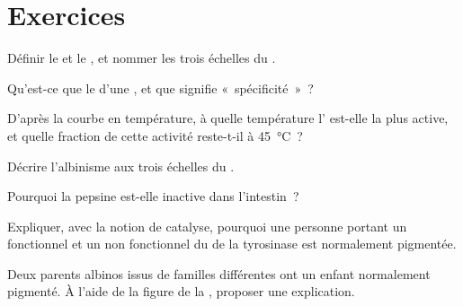 \section{Exercices}

\begin{exercise}[$\star$]\label{exo:g11:enzymes-and-phenotype:1}
Définir le  et le , et nommer les trois échelles du
.
\end{exercise}

\begin{exercise}[$\star$]\label{exo:g11:enzymes-and-phenotype:2}
Qu'est-ce que le  d'une , et que signifie
«~spécificité~»~?
\end{exercise}

\begin{exercise}[$\star$]\label{exo:g11:enzymes-and-phenotype:3}
D'après la courbe en température, à quelle température l' est-elle
la plus active, et quelle fraction de cette activité reste-t-il à
\qty{45}{\celsius}~?
\end{exercise}

\begin{exercise}[$\star$]\label{exo:g11:enzymes-and-phenotype:4}
Décrire l'albinisme aux trois échelles du .
\end{exercise}

\begin{exercise}[$\star$]\label{exo:g11:enzymes-and-phenotype:5}
Pourquoi la pepsine est-elle inactive dans l'intestin~?
\end{exercise}

\begin{exercise}[$\star\star$]\label{exo:g11:enzymes-and-phenotype:6}
Expliquer, avec la notion de catalyse, pourquoi une personne portant un
 fonctionnel et un  non fonctionnel du  de la
tyrosinase est normalement pigmentée.
\end{exercise}

\begin{exercise}[$\star\star$]\label{exo:g11:enzymes-and-phenotype:7}
Deux parents albinos issus de familles différentes ont un enfant
normalement pigmenté. À l'aide de la figure de la ,
proposer une explication.
\end{exercise}

